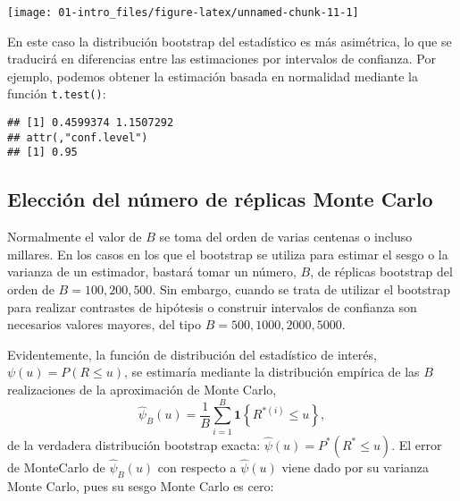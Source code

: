 \documentclass[
]{book}
\newenvironment{Shaded}{\begin{snugshade}}{\end{snugshade}}
\newcommand{\FunctionTok}[1]{\textcolor[rgb]{0.00,0.00,0.00}{#1}}
\newcommand{\NormalTok}[1]{#1}
\newcommand{\SpecialCharTok}[1]{\textcolor[rgb]{0.00,0.00,0.00}{#1}}
\theoremstyle{break}
\theoremstyle{definition}
\theoremstyle{definition}
\theoremstyle{definition}
\theoremstyle{definition}
\theoremstyle{remark}
\begin{document}
\begin{center}\texttt{[image: 01-intro\_files/figure-latex/unnamed-chunk-11-1]} \end{center}

En este caso la distribución bootstrap del estadístico es más asimétrica, lo que se traducirá en diferencias entre las estimaciones por intervalos de confianza.
Por ejemplo, podemos obtener la estimación basada en normalidad mediante la función \texttt{t.test()}:

\begin{Shaded}
\end{Shaded}

\begin{verbatim}
## [1] 0.4599374 1.1507292
## attr(,"conf.level")
## [1] 0.95
\end{verbatim}

\hypertarget{elecciuxf3n-del-nuxfamero-de-ruxe9plicas-monte-carlo}{%
\subsection{Elección del número de réplicas Monte Carlo}\label{elecciuxf3n-del-nuxfamero-de-ruxe9plicas-monte-carlo}}

Normalmente el valor de \(B\) se toma del orden de varias centenas o
incluso millares. En los casos en los que el bootstrap se utiliza para
estimar el sesgo o la varianza de un estimador, bastará tomar un número,
\(B\), de réplicas bootstrap del orden de \(B = 100, 200, 500\). Sin embargo,
cuando se trata de utilizar el bootstrap para realizar contrastes de
hipótesis o construir intervalos de confianza son necesarios valores
mayores, del tipo \(B = 500, 1000, 2000, 5000\).

Evidentemente, la función de distribución del estadístico de interés,
\(\psi \left( u \right) =P\left( R\leq u \right)\), se estimaría mediante
la distribución empírica de las \(B\) realizaciones de la aproximación de
Monte Carlo,
\[\hat{\psi}_{B}\left( u \right) =
\frac{1}{B}\sum_{i=1}^{B}\mathbf{1}\left\{ R^{\ast (i)}\leq u\right\},\]
de la verdadera distribución bootstrap exacta:
\(\hat{\psi}\left(u \right) =P^{\ast}\left( R^{\ast}\leq u \right)\).
El error de MonteCarlo de \(\hat{\psi}_{B}\left( u \right)\) con respecto
a \(\hat{\psi}\left( u \right)\) viene dado por su varianza Monte Carlo,
pues su sesgo Monte Carlo es cero:
\end{document}

